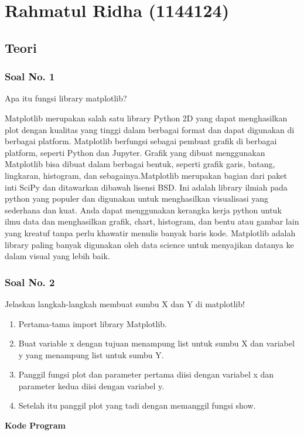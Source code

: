 \section{Rahmatul Ridha (1144124)}
\subsection{Teori}
\subsubsection{Soal No. 1}
\hfill \break
Apa itu fungsi library matplotlib?

\hfill \break
Matplotlib merupakan salah satu library Python 2D yang dapat menghasilkan plot dengan kualitas yang tinggi dalam berbagai format dan dapat digunakan di berbagai platform. Matplotlib berfungsi sebagai pembuat grafik di berbagai platform, seperti Python dan Jupyter. Grafik yang dibuat menggunakan Matplotlib bisa dibuat dalam berbagai bentuk, seperti grafik garis, batang, lingkaran, histogram, dan sebagainya.Matplotlib merupakan bagian dari paket inti SciPy dan ditawarkan dibawah lisensi BSD. Ini adalah library ilmiah pada python yang populer dan digunakan untuk menghasilkan visualisasi yang sederhana dan kuat. Anda dapat menggunakan kerangka kerja python untuk ilmu data dan menghasilkan grafik, chart, histogram, dan bentu atau gambar lain yang kreatuf tanpa perlu  khawatir menulis banyak baris kode. Matplotlib adalah library paling banyak digunakan oleh data science untuk menyajikan datanya ke dalam visual yang lebih baik.

\subsubsection{Soal No. 2}
\hfill \break
Jelaskan langkah-langkah membuat sumbu X dan Y di matplotlib!

\begin{enumerate}
	\item Pertama-tama import library Matplotlib.	
	
	
	\item Buat variable x dengan tujuan menampung list untuk sumbu X dan variabel y yang menampung list untuk sumbu Y.
	
	
	\item Panggil fungsi plot dan parameter pertama diisi dengan variabel x dan parameter kedua diisi dengan variabel y.
		

	\item Setelah itu panggil plot yang tadi dengan memanggil fungsi show.
	
	
\end{enumerate}
\hfill \break
\textbf{Kode Program}

